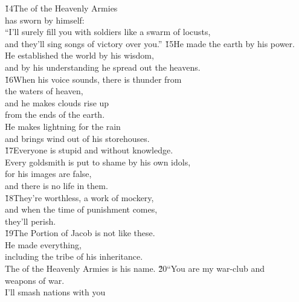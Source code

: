 \begin{poetry}
\poeml \v{14}The  of the Heavenly Armies \\
\poemll    has sworn by himself: \\
\poeml ``I'll surely fill you with soldiers like a swarm of locusts, \\
\poemll    and they'll sing songs of victory over you.''
\poeml \v{15}He made the earth by his power. \\
\poemll    He established the world by his wisdom, \\
\poemlll       and by his understanding he spread out the heavens. \\
\poeml \v{16}When his voice sounds, there is thunder from \\
\poemll    the waters of heaven, \\
\poeml and he makes clouds rise up \\
\poemll    from the ends of the earth. \\
\poeml He makes lightning for the rain \\
\poemll    and brings wind out of his storehouses. \\
\poeml \v{17}Everyone is stupid and without knowledge. \\
\poemll    Every goldsmith is put to shame by his own idols, \\
\poeml for his images are false, \\
\poemll    and there is no life in them. \\
\poeml \v{18}They're worthless, a work of mockery, \\
\poemll    and when the time of punishment comes, \\
\poemlll       they'll perish. \\
\poeml \v{19}The Portion of Jacob is not like these. \\
\poemll    He made everything, \\
\poeml including the tribe of his inheritance. \\
\poemll    The  of the Heavenly Armies is his name.
\poeml \v{20}``You are my war-club and \\
\poemll    weapons of war. \\
\poeml I'll smash nations with you \\

\end{poetry}
